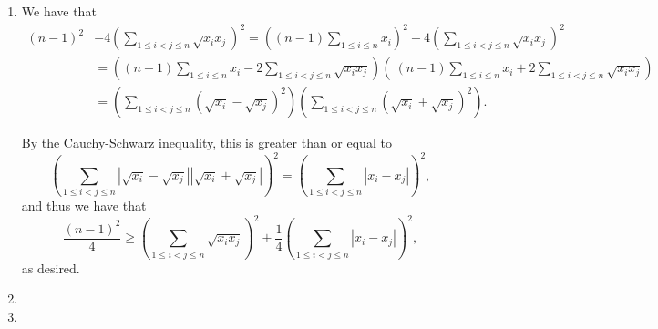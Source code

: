 \documentclass[12pt]{article}
\begin{document}
\begin{enumerate}
\item %
We have that
\begin{align*}
    (n - 1)^2 & - 4 \left(\sum_{1 \leq i < j \leq n} \sqrt{x_i x_j} \right)^2 
     = \left( (n - 1) \sum_{1 \leq i \leq n} x_i \right)^2 - 4 \left(\sum_{1
    \leq i < j \leq n} \sqrt{x_i x_j} \right)^2 \\
    & = \left( (n - 1) \sum_{1 \leq i \leq n} x_i - 2 \sum_{1 \leq i < j \leq n}
    \sqrt{x_i x_j} \right) \left( \ (n - 1) \sum_{1 \leq i \leq n} x_i + 2
    \sum_{1 \leq i < j \leq n} \sqrt{x_i x_j} \right) \\
    & = \left( \sum_{1 \leq i < j \leq n} (\sqrt{x_i} - \sqrt{x_j})^2 \right)
        \left( \sum_{1 \leq i < j \leq n} (\sqrt{x_i} + \sqrt{x_j})^2 \right).
\end{align*}

By the Cauchy-Schwarz inequality, this is greater than or equal to
\[
    \left( \sum_{1 \leq i < j \leq n} | \sqrt{x_i} - \sqrt{x_j} | | \sqrt{x_i} +
    \sqrt{x_j} | \right)^2 = \left( \sum_{1 \leq i < j \leq n} | x_i - x_j |
    \right)^2,
\]
and thus we have that
\[
    \frac{(n - 1)^2}{4} \geq \left( \sum_{1 \leq i < j \leq n} \sqrt{x_i x_j}
    \right)^2 + \frac{1}{4} \left( \sum_{1 \leq i < j \leq n} |x_i - x_j|
    \right)^2,
\]
as desired.

\item %


\item %
%


\end{enumerate}
\end{document}
